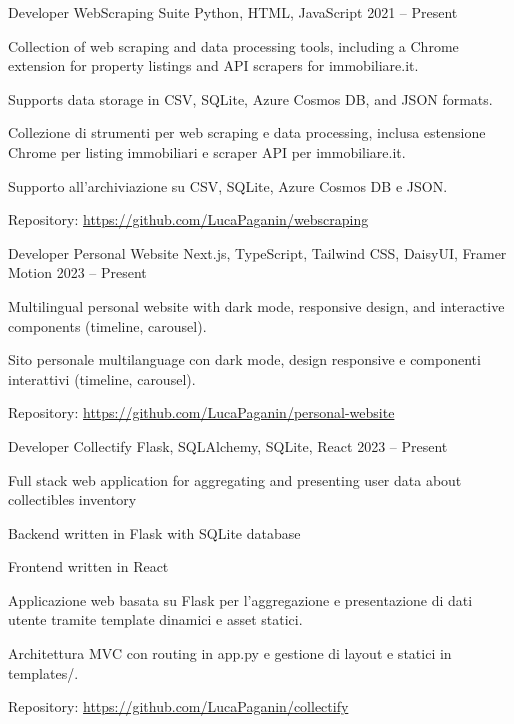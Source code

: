\begin{cventries}

\cventry
{Developer} %
{WebScraping Suite} %
{Python, HTML, JavaScript} %
{2021 -- Present} %
{ %
\begin{cvitems}
  \ifenglish
  \item {Collection of web scraping and data processing tools, including a Chrome extension for property listings and API scrapers for immobiliare.it.}
  \item {Supports data storage in CSV, SQLite, Azure Cosmos DB, and JSON formats.}
  \else
  \item {Collezione di strumenti per web scraping e data processing, inclusa estensione Chrome per listing immobiliari e scraper API per immobiliare.it.}
  \item {Supporto all'archiviazione su CSV, SQLite, Azure Cosmos DB e JSON.}
  \fi
  \item {Repository: \url{https://github.com/LucaPaganin/webscraping}}  
\end{cvitems}
}


\cventry
{Developer} %
{Personal Website} %
{Next.js, TypeScript, Tailwind CSS, DaisyUI, Framer Motion} %
{2023 -- Present} %
{ %
\begin{cvitems}
  \ifenglish
  \item {Multilingual personal website with dark mode, responsive design, and interactive components (timeline, carousel).}
  \else
  \item {Sito personale multilanguage con dark mode, design responsive e componenti interattivi (timeline, carousel).}
  \fi
  \item {Repository: \url{https://github.com/LucaPaganin/personal-website}}  
\end{cvitems}
}


\cventry
{Developer} %
{Collectify} %
{Flask, SQLAlchemy, SQLite, React} %
{2023 -- Present} %
{ %
\begin{cvitems}
  \ifenglish
  \item {Full stack web application for aggregating and presenting user data about collectibles inventory}
  \item {Backend written in Flask with SQLite database}
  \item {Frontend written in React}
  \else
  \item {Applicazione web basata su Flask per l'aggregazione e presentazione di dati utente tramite template dinamici e asset statici.}
  \item {Architettura MVC con routing in app.py e gestione di layout e statici in templates/.}
  \fi
  \item {Repository: \url{https://github.com/LucaPaganin/collectify}}  
\end{cvitems}
}

\end{cventries}